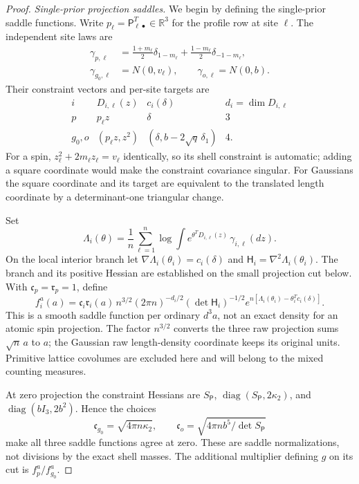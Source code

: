 \begin{proof}
\par\smallskip\noindent\textit{Single-prior projection saddles.}\enspace
We begin by defining the single-prior saddle functions. Write
\(p_\ell=\mathsf P_{\ell\bullet}^T\in\mathbb R^3\) for the
profile row at site \(\ell\). The independent site laws are
\[
\begin{split}
 \gamma_{p,\ell}&=\frac{1+m_\ell}{2}\delta_{1-m_\ell}
             +\frac{1-m_\ell}{2}\delta_{-1-m_\ell},\\
 \gamma_{g_0,\ell}&=N(0,v_\ell),\qquad
 \gamma_{o,\ell}=N(0,b).
\end{split}
\]
Their constraint vectors and per-site targets are
\[
\begin{array}{c|c|c|c}
 i&D_{i,\ell}(z)&c_i(\delta)&d_i=\dim D_{i,\ell}\\ \hline
 p&p_\ell z&\delta&3\\
 g_0,o&(p_\ell z,z^2)&(\delta,b-2\sqrt q\,\delta_1)&4.
\end{array}
\]
For a spin, \(z_\ell^2+2m_\ell z_\ell=v_\ell\) identically,
so its shell constraint is automatic; adding a square coordinate
would make the constraint covariance singular. For Gaussians the
square coordinate and its target are equivalent to the translated
length coordinate by a determinant-one triangular change.

Set
\[
 \Lambda_i(\theta)=\frac1n\sum_{\ell=1}^n
       \log\int e^{\theta^TD_{i,\ell}(z)}\,\gamma_{i,\ell}(dz).
\]
On the local interior branch let
\(\nabla\Lambda_i(\theta_i)=c_i(\delta)\) and
\(\mathsf H_i=\nabla^2\Lambda_i(\theta_i)\).
The branch and its positive Hessian are established on the small
projection cut below. With \(\mathfrak c_p=\mathfrak r_p=1\),
define
\[
 f_i^a(a)=\mathfrak c_i\mathfrak r_i(a)\,
 n^{3/2}(2\pi n)^{-d_i/2}(\det\mathsf H_i)^{-1/2}
 e^{n[\Lambda_i(\theta_i)-\theta_i^Tc_i(\delta)]}.
\]
This is a smooth saddle function per ordinary \(d^3a\), not an
exact density for an atomic spin projection. The factor \(n^{3/2}\)
converts the three raw projection sums \(\sqrt n\,a\) to \(a\);
the Gaussian raw length-density coordinate keeps its original
units. Primitive lattice covolumes are excluded here and will
belong to the mixed counting measures.

At zero projection the constraint Hessians are
\(S_{\mathsf P}\), \(\operatorname{diag}(S_{\mathsf P},2\kappa_2)\),
and \(\operatorname{diag}(bI_3,2b^2)\). Hence the choices
\[
 \mathfrak c_{g_0}=\sqrt{4\pi n\kappa_2},\qquad
 \mathfrak c_o=\sqrt{4\pi n b^5/\det S_{\mathsf P}}
\]
make all three saddle functions agree at zero. These are saddle
normalizations, not divisions by the exact shell masses.
The additional multiplier defining \(g\) on its cut is
\(f_p^a/f_{g_0}^a\).


\end{proof}
